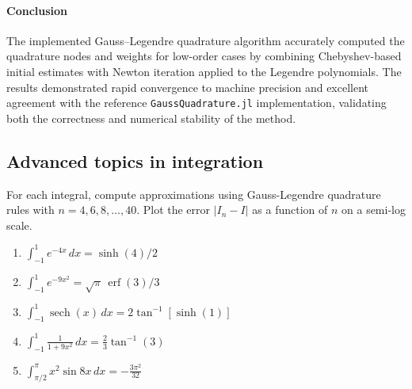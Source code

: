 \begin{solution}
	\paragraph{Conclusion}
	The implemented Gauss--Legendre quadrature algorithm accurately computed the
	quadrature nodes and weights for low-order cases by combining Chebyshev-based
	initial estimates with Newton iteration applied to the Legendre polynomials. The
	results demonstrated rapid convergence to machine precision and excellent
	agreement with the reference \texttt{GaussQuadrature.jl} implementation,
	validating both the correctness and numerical stability of the method.

\end{solution}

\subsection{Advanced topics in integration}

\begin{exercise}
	For each integral, compute approximations using Gauss-Legendre quadrature
	rules with $n=4,6,8,\ldots,40$. Plot the error $|I_n-I|$ as a function of $n$ on
	a semi-log scale.
	\begin{enumerate}
		\item $\int_{-1}^1 e^{-4x}\, dx = \sinh(4)/2$
		\item $\int_{-1}^1 e^{-9x^2} = \sqrt{\pi}\, \operatorname{erf}(3)/3$
		\item $\int_{-1}^1 \operatorname{sech}(x) \, dx = 2 \tan^{-1}[ \sinh (1) ]$
		\item $\int_{-1}^1 \frac{1}{1+9x^2}\, dx = \frac{2}{3} \tan^{-1}(3)$
		\item $\int_{\pi/2}^{\pi} x^2 \sin 8x \, d x = -\frac{3 \pi^2}{32}$
	\end{enumerate}
\end{exercise}

